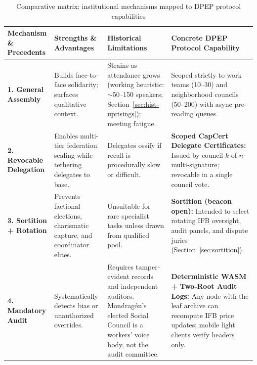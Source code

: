 \documentclass[10pt,twoside,openany]{book}
\renewcommand{\arraystretch}{1.22}
\theoremstyle{dpepstyle}
\begin{document}
\begin{table}[ht!]
\centering
\caption{Comparative matrix: institutional mechanisms mapped to DPEP protocol capabilities}
\label{tab:hist-matrix}
\vspace{3pt}
\scriptsize
\setlength{\tabcolsep}{4.5pt}
\renewcommand{\arraystretch}{1.20}
\begin{tabularx}{\textwidth}{L{1.12in} L{1.02in} L{1.02in} Y}
\toprule
\textbf{Mechanism \& Precedents} & \textbf{Strengths \& Advantages} & \textbf{Historical Limitations} & \textbf{Concrete DPEP Protocol Capability} \\
\midrule
\textbf{1. General Assembly} & Builds face-to-face solidarity; surfaces qualitative context. & Strains as attendance grows (working heuristic: $\sim$50--150 speakers; Section~\ref{sec:hist-uprisings}); meeting fatigue. & Scoped strictly to work teams (10--30) and neighborhood councils (50--200) with async pre-reading queues. \\
\addlinespace[4pt]
\textbf{2. Revocable Delegation} & Enables multi-tier federation scaling while tethering delegates to base. & Delegates ossify if recall is procedurally slow or difficult. & \textbf{Scoped CapCert Delegate Certificates:} Issued by council $k$-of-$n$ multi-signature; revocable in a single council vote. \\
\addlinespace[4pt]
\textbf{3. Sortition + Rotation} & Prevents factional elections, charismatic capture, and coordinator elites. & Unsuitable for rare specialist tasks unless drawn from qualified pool. & \textbf{Sortition (beacon open):} Intended to select rotating IFB oversight, audit panels, and dispute juries (Section~\ref{sec:sortition}). \\
\addlinespace[4pt]
\textbf{4. Mandatory Audit} & Systematically detects bias or unauthorized overrides. & Requires tamper-evident records and independent auditors. Mondrag\'on's elected Social Council is a workers' voice body, not the audit committee. & \textbf{Deterministic WASM + Two-Root Audit Logs:} Any node with the leaf archive can recompute IFB price updates; mobile light clients verify headers only. \\

\end{tabularx}
\end{table}
\end{document}
